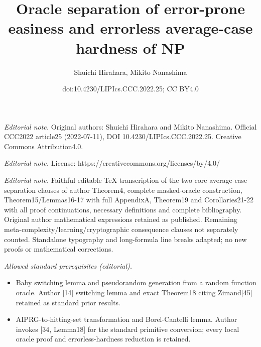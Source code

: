 \documentclass[10pt,a4paper]{article}
\title{Oracle separation of error-prone easiness and errorless average-case hardness of NP}
\author{Shuichi Hirahara, Mikito Nanashima}
\date{doi:10.4230/LIPIcs.CCC.2022.25; CC BY4.0}
\begin{document}
\maketitle
\noindent\textit{Editorial note.} Original authors: Shuichi Hirahara and Mikito Nanashima. Official CCC2022 article25 (2022-07-11), DOI 10.4230/LIPIcs.CCC.2022.25. Creative Commons Attribution4.0.\par\medskip
\noindent\textit{Editorial note.} License: https://creativecommons.org/licenses/by/4.0/\par\medskip
\noindent\textit{Editorial note.} Faithful editable TeX transcription of the two core average-case separation clauses of author Theorem4, complete masked-oracle construction, Theorem15/Lemmas16-17 with full AppendixA, Theorem19 and Corollaries21-22 with all proof continuations, necessary definitions and complete bibliography. Original author mathematical expressions retained as published. Remaining meta-complexity/learning/cryptographic consequence clauses not separately counted. Standalone typography and long-formula line breaks adapted; no new proofs or mathematical corrections.\par\medskip
\noindent\textit{Allowed standard prerequisites (editorial).}\begin{itemize}
\item Baby switching lemma and pseudorandom generation from a random function oracle. Author [14] switching lemma and exact Theorem18 citing Zimand[45] retained as standard prior results.
\item AIPRG-to-hitting-set transformation and Borel-Cantelli lemma. Author invokes [34, Lemma18] for the standard primitive conversion; every local oracle proof and errorless-hardness reduction is retained.
\end{itemize}\medskip
\end{document}
